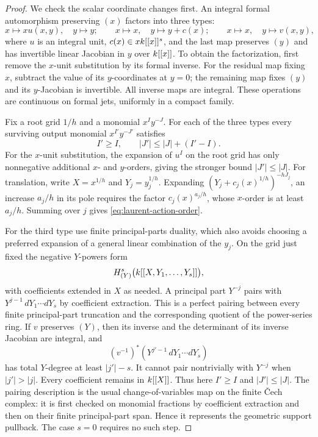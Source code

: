 \begin{proof}
We check the scalar coordinate changes first.  An integral formal
automorphism preserving $(x)$ factors into three types:
\[
 x\longmapsto xu(x,y),\quad y\longmapsto y;
 \qquad x\longmapsto x,\quad y\longmapsto y+c(x);
 \qquad x\longmapsto x,\quad y\longmapsto v(x,y),
\]
where $u$ is an integral unit, $c(x)\in xk[[x]]^s$, and the last
map preserves $(y)$ and has invertible linear Jacobian in $y$ over
$k[[x]]$.  To obtain the factorization, first remove the $x$-unit
substitution by its formal inverse.  For the residual map fixing
$x$, subtract the value of its $y$-coordinates at $y=0$; the
remaining map fixes $(y)$ and its $y$-Jacobian is invertible.
All inverse maps are integral.  These operations are continuous on
formal jets, uniformly in a compact family.

Fix a root grid $1/h$ and a monomial $x^Iy^{-J}$.  For each of the
three types every surviving output monomial $x^{I'}y^{-J'}$ satisfies
\begin{equation}\label{eq:laurent-action-order}
 I'\geq I,\qquad |J'|\leq |J|+(I'-I).
\end{equation}
For the $x$-unit substitution, the expansion of $u^I$ on the root
grid has only nonnegative additional $x$- and $y$-orders, giving
the stronger bound $|J'|\leq|J|$.  For translation, write
$X=x^{1/h}$ and $Y_j=y_j^{1/h}$.  Expanding
$(Y_j+c_j(x)^{1/h})^{-hJ_j}$, an increase $a_j/h$ in its pole
requires the factor $c_j(x)^{a_j/h}$, whose $x$-order is at least
$a_j/h$.  Summing over $j$ gives
\cref{eq:laurent-action-order}.

For the third type use finite principal-parts duality, which also
avoids choosing a preferred expansion of a general linear
combination of the $y_j$.  On the grid just fixed the negative
$Y$-powers form
\[
 H^s_{(Y)}\bigl(k[[X,Y_1,\ldots,Y_s]]\bigr),
\]
with coefficients extended in $X$ as needed.  A principal part
$Y^{-j}$ pairs with $Y^{j-1}\,dY_1\cdots dY_s$ by coefficient
extraction.  This is a perfect pairing between every finite
principal-part truncation and the corresponding quotient of the
power-series ring.  If $v$ preserves $(Y)$, then its inverse and
the determinant of its inverse Jacobian are integral, and
\[
 (v^{-1})^*(Y^{j'-1}\,dY_1\cdots dY_s)
\]
has total $Y$-degree at least $|j'|-s$.  It cannot pair nontrivially
with $Y^{-j}$ when $|j'|>|j|$.  Every coefficient remains in
$k[[X]]$.  Thus here $I'\geq I$ and $|J'|\leq|J|$.
The pairing description is the usual change-of-variables map on
the finite \v Cech complex: it is first checked on monomial
fractions by coefficient extraction and then on their finite
principal-part span.  Hence it represents the geometric support
pullback.  The case $s=0$ requires no such step.


\end{proof}
